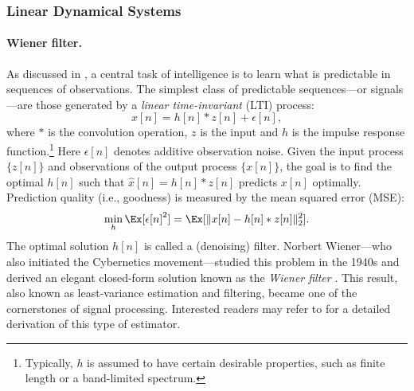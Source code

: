 \documentclass[../../book-main.tex]{subfiles}
\begin{document}
\subsubsection{Linear Dynamical Systems} \label{sec:linear-systems}

\vspace{2mm}
\paragraph{Wiener filter.}
As discussed in , a central task of
intelligence is to learn what is predictable in sequences of
observations. The simplest class of predictable sequences---or
signals---are those generated by a \textit{linear time-invariant} (LTI) process:
\begin{equation}
    x[n] = h[n]*z[n] + \epsilon[n],
    \label{eqn:Wiener-model}
\end{equation}
where \(*\) is the convolution operation, \(z\) is the input and
\(h\) is the impulse response function.\footnote{Typically, \(h\) is
    assumed to have certain desirable properties, such as finite length
or a band-limited spectrum.} Here \(\epsilon[n]\) denotes additive
observation noise. Given the input process \(\{z[n]\}\) and
observations of the output process \(\{x[n]\}\), the goal is to find
the optimal \(h[n]\) such that \(\hat{x}[n] = h[n]*z[n]\) predicts
\(x[n]\) optimally. Prediction quality (i.e., goodness) is measured
by the mean squared error (MSE):
\begin{equation}
    \min_{h} \Ex[\epsilon[n]^{2}] = \Ex[\|x[n] - h[n]*z[n]\|_{2}^{2}].
    \label{eqn:wiener-mse}
\end{equation}
The optimal solution \(h[n]\) is called a (denoising) filter. Norbert
Wiener---who also initiated the Cybernetics movement---studied this
problem in the 1940s and derived an elegant closed-form solution
known as the \textit{Wiener filter} \cite{Wiener-1942,Wiener-1949}.
This result, also known as least-variance estimation and filtering,
became one of the cornerstones of signal processing. Interested
readers may refer to \cite[Appendix B]{MaY2003} for a detailed
derivation of this type of estimator.
\end{document}
